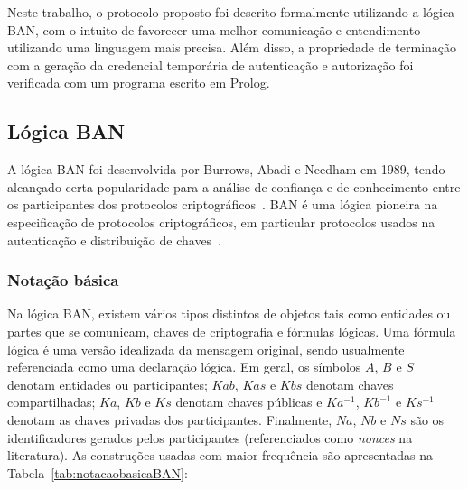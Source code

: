 Neste trabalho, o protocolo proposto foi descrito formalmente utilizando a lógica BAN, com o intuito de favorecer uma melhor comunicação e entendimento utilizando uma linguagem mais precisa. Além disso, a propriedade de terminação com a geração da credencial temporária de autenticação e autorização foi verificada com um programa escrito em Prolog.

\subsection{Lógica BAN}

A lógica BAN foi desenvolvida por Burrows, Abadi e Needham em 1989, tendo alcançado certa popularidade para a análise de confiança e de conhecimento entre os participantes dos protocolos criptográficos~\cite{Burrows1990}. BAN é uma lógica pioneira na especificação de protocolos criptográficos, em particular protocolos usados na autenticação e
distribuição de chaves~\cite{Burrows1990}.

\subsubsection{Notação básica}

Na lógica BAN, existem vários tipos distintos de objetos tais como entidades ou partes que se comunicam, chaves de criptografia e fórmulas lógicas. Uma fórmula lógica é uma versão idealizada da mensagem original, sendo usualmente referenciada como uma declaração lógica. Em geral, os símbolos $A$, $B$ e $S$ denotam entidades ou participantes; $Kab$, $Kas$ e $Kbs$ denotam chaves compartilhadas; $Ka$, $Kb$ e $Ks$ denotam chaves públicas e $Ka^{-1}$, $Kb^{-1}$ e $Ks^{-1}$ denotam as chaves privadas dos participantes.
Finalmente, $Na$, $Nb$ e $Ns$ são os identificadores gerados pelos participantes (referenciados como \emph{nonces}
na literatura). As construções usadas com maior frequência são apresentadas na Tabela~\ref{tab:notacaobasicaBAN}:

\newcommand{\RHQuery}{\textbf{[???]}}
\newcommand{\RHRemark}[1]{\textbf{[#1]}}
\newcommand{\Believess}[2]{{#1}\mathrel{\textbf{\mid\equiv}}{#2}}
\newcommand{\Seess}[2]{{#1}\mathrel{\textbf{\triangleleft}}{#2}}
\newcommand{\Saids}[2]{{#1}\mathrel{\textbf{\mid\sim}}{#2}}

\newcommand{\Believes}[2]{{#1}\mathrel{\textbf{acredita}}{#2}}
\newcommand{\Sees}[2]{{#1}\mathrel{\textbf{recebeu}}{#2}}
\newcommand{\Said}[2]{{#1}\mathrel{\textbf{disse}}{#2}}
\newcommand{\Controls}[2]{{#1}\mathrel{\textbf{controla}}{#2}}
\newcommand{\Fresh}[1]{{#1}\,\textbf{novo}}
\newcommand{\Share}[3]{{#1}\stackrel{#2}{\longleftrightarrow}{#3}}
\newcommand{\ShareSecret}[3]{{#1}\stackrel{#2}{\rightleftharpoons}{#3}}
\newcommand{\PubKey}[2]{{}\stackrel{#1}{\mapsto}{#2}}
\newcommand{\Secret}[3]{{#1}\stackrel{#2}{\leftrightharpoons}{#3}}
\newcommand{\Encrypt}[2]{\{\,{#1}\,\}_{#2}}
\newcommand{\EncryptFrom}[3]{\{\,{#1}\,\}_{#2}^{#3}}
\newcommand{\Attach}[2]{\langle {#1}\rangle_{#2}}

